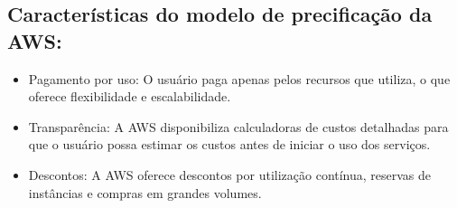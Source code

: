 \documentclass[a4paper,12pt]{article}
\begin{document}
\subsection*{Características do modelo de precificação da AWS:}
\begin{itemize}[left=0pt]
    \item Pagamento por uso: O usuário paga apenas pelos recursos que utiliza, o que oferece flexibilidade e escalabilidade.
    \item Transparência: A AWS disponibiliza calculadoras de custos detalhadas para que o usuário possa estimar os custos antes de iniciar o uso dos serviços.
    \item Descontos: A AWS oferece descontos por utilização contínua, reservas de instâncias e compras em grandes volumes.
\end{itemize}
\end{document}
